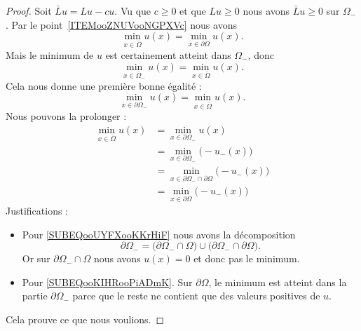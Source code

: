 \begin{proof}
	Soit \( \bar Lu=Lu-cu\). Vu que \( c\geq 0\) et que \( Lu\geq 0\) nous avons \( \bar Lu\geq 0\) sur \( \Omega_-\). Par le point~\ref{ITEMooZNUVooNGPXVc} nous avons
	\begin{equation}
		\min_{x\in \bar \Omega}u(x)=\min_{x\in\partial\Omega}u(x).
	\end{equation}
	Mais le minimum de \( u\) est certainement atteint dans \( \Omega_-\), donc
	\begin{equation}
		\min_{x\in\bar\Omega_-}u(x)=\min_{x\in\bar\Omega}u(x).
	\end{equation}
	Cela nous donne une première bonne égalité :
	\begin{equation}
		\min_{x\in\partial\Omega_-}u(x)=\min_{x\in\bar \Omega}u(x).
	\end{equation}
	Nous pouvons la prolonger :
	\begin{subequations}
		\begin{align}
			\min_{x\in\bar\Omega}u(x) & =\min_{x\in \partial\Omega_-}u(x)                                                              \\
			                          & =\min_{x\in\partial\Omega_-}\big( -u_-(x) \big)                                                \\
			                          & =\min_{x\in\partial\Omega_-\cap\partial\Omega}\big( -u_-(x) \big)  \label{SUBEQooUYFXooKKrHiF} \\
			                          & =\min_{x\in\partial\Omega}\big( -u_-(x) \big)          \label{SUBEQooKIHRooPiADmK}
		\end{align}
	\end{subequations}
	Justifications :
	\begin{itemize}
		\item Pour \eqref{SUBEQooUYFXooKKrHiF} nous avons la décomposition
		      \begin{equation}
			      \partial \Omega_-=\big( \partial\Omega_-\cap\Omega \big)\cup\big( \partial\Omega_-\cap\partial \Omega \big).
		      \end{equation}
		      Or sur \( \partial\Omega_-\cap\Omega\) nous avons \( u(x)=0\) et donc pas le minimum.
		\item Pour \eqref{SUBEQooKIHRooPiADmK}. Sur \( \partial\Omega\), le minimum est atteint dans la partie \( \partial\Omega_-\) parce que le reste ne contient que des valeurs positives de \( u\).
	\end{itemize}

	Cela prouve ce que nous voulions.
\end{proof}

